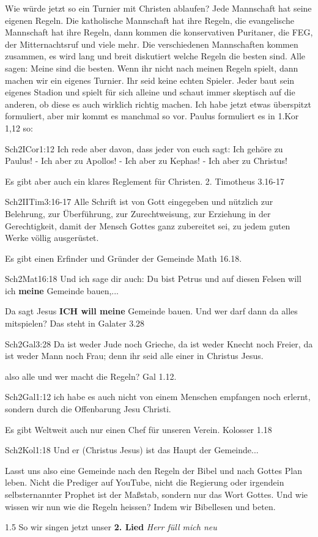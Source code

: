 \documentclass{../inc/mybib}
\begin{document}
\begin{spacing}{1.5}
Wie würde jetzt so ein Turnier mit Christen ablaufen? Jede Mannschaft hat seine eigenen Regeln. Die katholische Mannschaft hat ihre Regeln, die evangelische Mannschaft hat ihre Regeln, dann kommen die konservativen Puritaner, die FEG, der Mitternachtsruf und viele mehr. Die verschiedenen Mannschaften kommen zusammen, es wird lang und breit diskutiert welche Regeln die besten sind. Alle sagen: \glqq Meine sind die besten. Wenn ihr nicht nach meinen Regeln spielt, dann machen wir ein eigenes Turnier. Ihr seid keine echten Spieler.\grqq{} Jeder baut sein eigenes Stadion und spielt für sich alleine und schaut immer skeptisch auf die anderen, ob diese es auch wirklich richtig machen.
Ich habe jetzt etwas überspitzt formuliert, aber mir kommt es manchmal so vor.
Paulus formuliert es in 1.Kor 1,12 so: 
\begin{bibeltext}{Sch2}{ICor}{1:12}
Ich rede aber davon, dass jeder von euch sagt: Ich gehöre zu Paulus! - Ich aber zu Apollos! - Ich aber zu Kephas! - Ich aber zu Christus!
\end{bibeltext}
Es gibt aber auch ein klares Reglement für Christen. 2. Timotheus 3.16-17
\begin{bibeltext}{Sch2}{IITim}{3:16-17}
Alle Schrift ist von Gott eingegeben und nützlich zur Belehrung, zur Überführung, zur Zurechtweisung, zur Erziehung in der Gerechtigkeit, damit der Mensch Gottes ganz zubereitet sei, zu jedem guten Werke völlig ausgerüstet.
\end{bibeltext}
Es gibt einen Erfinder und Gründer der Gemeinde Math 16.18. 
\begin{bibeltext}{Sch2}{Mat}{16:18}
Und ich sage dir auch: Du bist Petrus und auf diesen Felsen will ich \textbf{meine} Gemeinde bauen,...
\end{bibeltext}
Da sagt Jesus \textbf{ICH will meine} Gemeinde bauen.
Und wer darf dann da alles mitspielen? Das steht in  Galater 3.28
\begin{bibeltext}{Sch2}{Gal}{3:28}
Da ist weder Jude noch Grieche, da ist weder Knecht noch Freier, da ist weder Mann noch Frau; denn ihr seid alle einer in Christus Jesus.
\end{bibeltext}
also alle und wer macht die Regeln? Gal 1.12.
\begin{bibeltext}{Sch2}{Gal}{1:12}
ich habe es auch nicht von einem Menschen empfangen noch erlernt, sondern durch die Offenbarung Jesu Christi.
\end{bibeltext}
Es gibt Weltweit auch nur einen Chef für unseren Verein. Kolosser 1.18
\begin{bibeltext}{Sch2}{Kol}{1:18}
Und er (Christus Jesus) ist das Haupt der Gemeinde...
\end{bibeltext}
Lasst uns also eine Gemeinde nach den Regeln der Bibel und nach Gottes Plan leben. 
Nicht die Prediger auf YouTube, nicht die Regierung oder irgendein selbsternannter Prophet ist der Maßstab, sondern nur das Wort Gottes. Und wie wissen wir nun wie die Regeln heissen? Indem wir Bibellesen und beten. 
\end{spacing}{1.5}
So wir singen jetzt unser \textbf{2. Lied} \textit{Herr füll mich neu}
\end{document}
